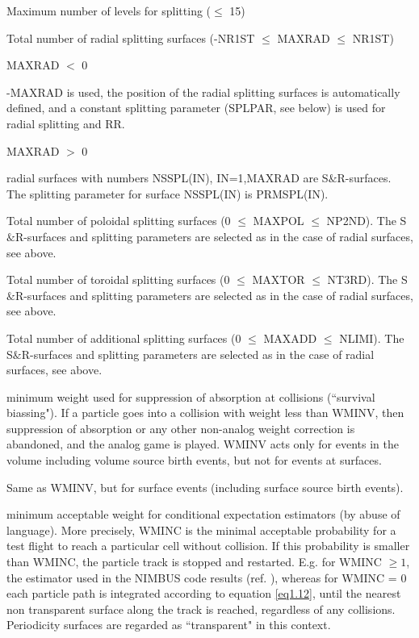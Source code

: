 \begin{list}{ }{}
\item[{\bf MAXLEV }]
Maximum number of levels for splitting ($\le$ 15)
\item[{\bf MAXRAD }]
Total number of radial splitting surfaces (-NR1ST $\le$ MAXRAD $\le$ NR1ST)
\begin{list}{ }{}
\item MAXRAD $<$ 0

-MAXRAD is used, the position of the
radial splitting surfaces is automatically defined, and a constant
splitting parameter (SPLPAR, see below) is used for radial splitting and RR.
\item MAXRAD $>$ 0

radial surfaces with numbers NSSPL(IN), IN=1,MAXRAD are
S$\&$R-surfaces. The splitting parameter for surface NSSPL(IN) is
PRMSPL(IN).
\end{list}
\item[{\bf MAXPOL }] Total number of poloidal splitting surfaces
(0 $\le$ MAXPOL $\le$ NP2ND). The S$\&$R-surfaces and splitting
parameters are selected as in the case of radial surfaces, see
above. 
\item[{\bf MAXTOR }] Total number of toroidal splitting
surfaces (0 $\le$ MAXTOR $\le$ NT3RD). The S$\&$R-surfaces and
splitting parameters are selected as in the case of radial
surfaces, see above. 
\item[{\bf MAXADD }] Total number of
additional splitting surfaces (0 $\le$ MAXADD $\le$ NLIMI). The
S$\&$R-surfaces and splitting parameters are selected as in the
case of radial surfaces, see above. 
\item[{\bf WMINV }] minimum
weight used for suppression of absorption at collisions
(``survival biassing"). If a particle goes into a collision with
weight less than WMINV, then suppression of absorption or any
other non-analog weight correction is abandoned, and the analog
game is played. WMINV acts only for events in the volume including
volume source birth events, but not for events at surfaces.
\item[{\bf WMINS }] Same as WMINV, but for surface events
(including surface source birth events). 
\item[{\bf WMINC }]
minimum acceptable weight for conditional expectation estimators
(by abuse of language). More precisely, WMINC is the minimal
acceptable probability for a test flight to reach a particular
cell without collision. If this probability is smaller than WMINC,
the particle track is stopped and restarted. E.g. for WMINC $\ge
1$, the estimator used in the NIMBUS code results (ref.
\cite{kn:Cupini}), whereas for WMINC = 0 each particle path is
integrated according to equation \ref{eq1.12}, until the nearest
non transparent surface along the track is reached, regardless of
any collisions. Periodicity surfaces are regarded as ``transparent" in this context.



\end{list}
